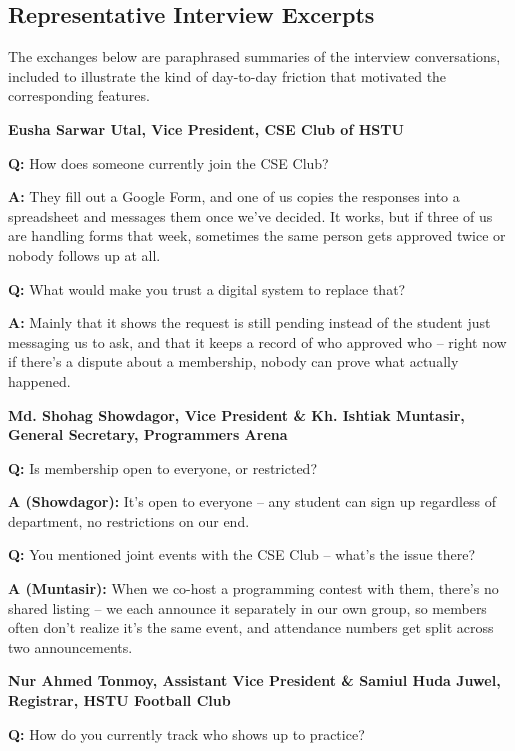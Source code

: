 \documentclass[12pt,oneside]{book}
\begin{document}
\subsection{Representative Interview Excerpts}

The exchanges below are paraphrased summaries of the interview conversations, included to illustrate the kind of day-to-day friction that motivated the corresponding features.

\medskip
\noindent\textbf{Eusha Sarwar Utal, Vice President, CSE Club of HSTU}

\smallskip
\noindent\textbf{Q:} How does someone currently join the CSE Club?

\noindent\textbf{A:} They fill out a Google Form, and one of us copies the responses into a spreadsheet and messages them once we've decided. It works, but if three of us are handling forms that week, sometimes the same person gets approved twice or nobody follows up at all.

\smallskip
\noindent\textbf{Q:} What would make you trust a digital system to replace that?

\noindent\textbf{A:} Mainly that it shows the request is still pending instead of the student just messaging us to ask, and that it keeps a record of who approved who -- right now if there's a dispute about a membership, nobody can prove what actually happened.

\bigskip
\noindent\textbf{Md. Shohag Showdagor, Vice President \& Kh. Ishtiak Muntasir, General Secretary, Programmers Arena}

\smallskip
\noindent\textbf{Q:} Is membership open to everyone, or restricted?

\noindent\textbf{A (Showdagor):} It's open to everyone -- any student can sign up regardless of department, no restrictions on our end.

\smallskip
\noindent\textbf{Q:} You mentioned joint events with the CSE Club -- what's the issue there?

\noindent\textbf{A (Muntasir):} When we co-host a programming contest with them, there's no shared listing -- we each announce it separately in our own group, so members often don't realize it's the same event, and attendance numbers get split across two announcements.

\bigskip
\noindent\textbf{Nur Ahmed Tonmoy, Assistant Vice President \& Samiul Huda Juwel, Registrar, HSTU Football Club}

\smallskip
\noindent\textbf{Q:} How do you currently track who shows up to practice?
\end{document}
